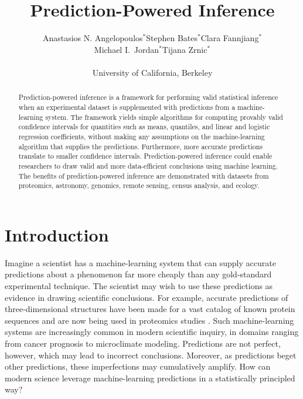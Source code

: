 \documentclass[10pt]{article}
\title{Prediction-Powered Inference}
\author{Anastasios N. Angelopoulos$^*$\quad Stephen Bates$^*$\quad Clara Fannjiang$^*$\\
Michael I.~Jordan$^*$\quad Tijana Zrnic$^*$\\ \\
University of California, Berkeley
}
\date{}
\begin{document}
\maketitle

\def\thefootnote{*}
\def\thefootnote{\arabic{footnote}}

\begin{abstract}
Prediction-powered inference is a framework for performing valid statistical inference when an experimental dataset is supplemented with predictions from a machine-learning system. The framework yields simple algorithms for computing provably valid confidence intervals for quantities such as means, quantiles, and linear and logistic regression coefficients, without making any assumptions on the machine-learning algorithm that supplies the predictions. Furthermore, more accurate predictions translate to smaller confidence intervals. Prediction-powered inference could enable researchers to draw valid and more data-efficient conclusions using machine learning. The benefits of prediction-powered inference are demonstrated with datasets from proteomics, astronomy, genomics, remote sensing, census analysis, and ecology.
\end{abstract}

\section{Introduction}
\label{sec:introduction}


Imagine a scientist has a machine-learning system that can supply accurate predictions about a phenomenon far more cheaply than any gold-standard experimental technique. The scientist may wish to use these predictions as evidence in drawing scientific conclusions. For example, accurate predictions of three-dimensional structures have been made for a vast catalog of known protein sequences \cite{jumper2021highly,tunyasuvunakool2021highly} and are now being used in proteomics studies \cite{bludau2022structural,barrio2023clustering}. Such machine-learning systems are increasingly common in modern scientific inquiry, in domains ranging from cancer prognosis to microclimate modeling.  Predictions are not perfect, however, which may lead to incorrect conclusions.  Moreover, as predictions beget other predictions, these imperfections may cumulatively amplify.  How can modern science leverage machine-learning predictions in a statistically principled way? 
\end{document}
